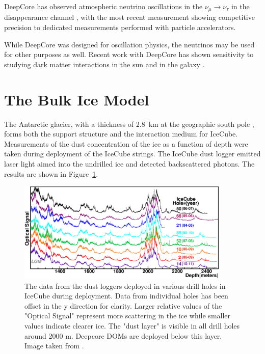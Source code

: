DeepCore has observed atmospheric neutrino oscillations in the $\nu_\mu \rightarrow \nu_\tau$ in the disappearance channel \cite{IceCube-Oscillation2013,IceCube-Oscillation2015,IceCube-Oscillation2018}, with the most recent measurement showing competitive precision to dedicated measurements performed with particle accelerators.

While DeepCore was designed for oscillation physics, the neutrinos may be used for other purposes as well. 
Recent work with DeepCore has shown sensitivity to studying dark matter interactions in the sun \cite{IceCube-LE-SolarDarkMatter} and in the galaxy \cite{IceCube-LE-GalacticDarkMatter}.









\section{The Bulk Ice Model}
\label{sec:bulk_ice}
The Antarctic glacier, with a thickness of 2.8~km at the geographic south pole \cite{IceCube-SpiceMie}, forms both the support structure and the interaction medium for IceCube.
Measurements of the dust concentration of the ice as a function of depth were taken during deployment of the IceCube strings.
The IceCube dust logger emitted laser light aimed into the undrilled ice and detected backscattered photons\cite{IceCube-DustLogger1, IceCube-DustLogger2}.
The results are shown in Figure~\ref{fig:dust_logger}.

\begin{figure}[h]
\includegraphics[width=0.9\textwidth]{dustlogger.eps} 
\caption[Dust concentration measurements from deployment of strings]{The data from the dust loggers deployed in various drill holes in IceCube during deployment. Data from individual holes has been offset in the y direction for clarity. Larger relative values of the "Optical Signal" represent more scattering in the ice while smaller values indicate clearer ice. The "dust layer" is visible in all drill holes around 2000 m. Deepcore DOMs are deployed below this layer. Image taken from \cite{IceCube-DustLogger-Raw}.}
\label{fig:dust_logger}
\end{figure}

